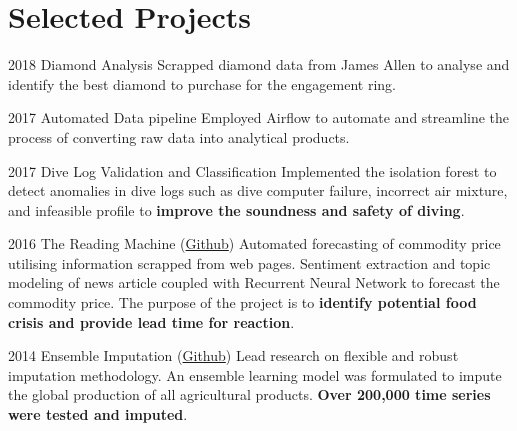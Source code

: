 \documentclass{tccv}
\begin{document}
\section{Selected Projects}
\begin{yearlist}

\item{2018} {Diamond Analysis} {Scrapped diamond data from James Allen
  to analyse and identify the best diamond to purchase for the
  engagement ring.}
  
\item{2017} {Automated Data pipeline} {Employed Airflow to automate
  and streamline the process of converting raw data into analytical
  products.}
  
\item{2017} {Dive Log Validation and Classification} {Implemented the
  isolation forest to detect anomalies in dive logs such as dive
  computer failure, incorrect air mixture, and infeasible profile to
  \textbf{improve the soundness and safety of diving}.}

\item{2016} {The Reading Machine
  (\href{https://github.com/EST-Team-Adam/TheReadingMachine}{Github})}
  {Automated forecasting of commodity price utilising information
    scrapped from web pages. Sentiment extraction and topic modeling
    of news article coupled with Recurrent Neural Network to forecast
    the commodity price. The purpose of the project is to
    \textbf{identify potential food crisis and provide lead time for
      reaction}.}
  
  
\item{2014} {Ensemble Imputation
  (\href{https://github.com/mkao006/sws\_imputation}{Github})} {Lead
  research on flexible and robust imputation methodology. An ensemble
  learning model was formulated to impute the global production of all
  agricultural products. \textbf{Over 200,000 time series were tested
    and imputed}.}



\end{yearlist}
\end{document}

